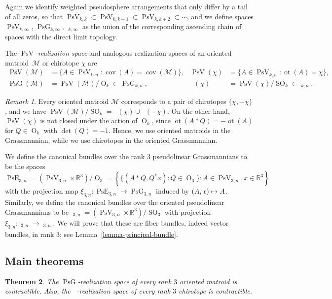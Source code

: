 \documentclass[11pt]{article}
\newcommand{\Subsection}{\subsection}
\numberwithin{equation}{section}
\newcommand\mto{\mathchoice{\longmapsto}{\mapsto}{\mapsto}{\mapsto}}
\newtheorem{theorem}{Theorem}[subsection]
\theoremstyle{remark}
\newtheorem{remark}[theorem]{Remark}
\let\mc\mathcal
\let\mb\mathbb
\let\df\emph
\DeclareMathOperator{\pg}{PsG}
\DeclareMathOperator{\pog}{Ps\widetilde G}
\DeclareMathOperator{\pe}{PsE}
\DeclareMathOperator{\poe}{Ps\widetilde{E}}
\DeclareMathOperator{\orth}{O}
\DeclareMathOperator{\sorth}{SO}
\DeclareMathOperator{\pstief}{PsV}
\DeclareMathOperator{\cov}{cov}
\DeclareMathOperator{\ot}{ot}
\begin{document}
Again we identify weighted pseudosphere arrangements that only differ by a tail of all zeros, so that $\pstief_{k,k} \subset \pstief_{k,k+1} \subset \pstief_{k,k+2} \subset \cdots$, and we define spaces $\pstief_{k,\infty}$, $\pg_{k,\infty}$, $\pog_{k,\infty}$ as the union of the corresponding ascending chain of spaces with the direct limit topology.

The $\pstief$\df{-realization space} and analogous realization spaces of an oriented matroid~$\mc{M}$ or chirotope $\chi$ are
\begin{align*}
\pstief(\mc{M}) &=\{ A \in \pstief_{k,n}:\cov (A) = \cov(\mc{M})\}, &
\pstief(\chi) &=\{ A \in \pstief_{k,n}:\ot (A) = \chi\}, \\
\pg(\mc{M}) &= \pstief(\mc{M})/\orth_k \subset \pg_{k,n}, &
\pog(\chi) &= \pstief(\chi)/\sorth_k \subset \pog_{k,n}.
\end{align*}

\begin{remark}
Every oriented matroid $\mc{M}$ corresponds to a pair of chirotopes $\{\chi,-\chi\}$, and we have $\pstief(\mc{M})/\sorth_k = \pog(\chi) \cup \pog(-\chi)$.
On the other hand, $\pstief(\chi)$ is not closed under the action of $\orth_k$, since $\ot(A*Q) = -\ot(A)$ for $Q \in \orth_k$ with $\det(Q) = -1$.
Hence, we use oriented matroids in the Grassmannian, while we use chirotopes in the oriented Grassmannian.
\end{remark}

We define the canonical bundles over the rank $3$ pseudolinear Grassmannians to be the spaces
\[ \pe_{3,n} = (\pstief_{3,n} \times \mb{R}^3)/{\orth_3} = \left\{ \{(A*Q, Q^* x) : Q \in \orth_3 \} : A \in \pstief_{3,n}, x \in \mb{R}^3 \right\} \]
with the projection map $ \xi_{3,n}: \pe_{3,n} \to \pg_{3,n} $ induced by $(A,x) \mto A$.
Similarly, we define the canonical bundles over the oriented pseudolinear Grassmannians to be
$\poe_{3,n} = (\pstief_{3,n} \times \mb{R}^3)/{\sorth_3}$ with projection $ \widetilde\xi_{3,n}: \poe_{3,n} \to \pog_{3,n} $.
We will prove that these are fiber bundles, indeed vector bundles, in rank 3; see Lemma~\ref{lemma-principal-bundle}.

\Subsection{Main theorems}\label{subsection-main-theorems}

\begin{theorem}\label{theorem-pseudoreal-contract}
The $\pg$-realization space of every rank $3$ oriented matroid is contractible.
Also, the $\pog$-realization space of every rank $3$ chirotope is contractible.
\end{theorem}
\end{document}
